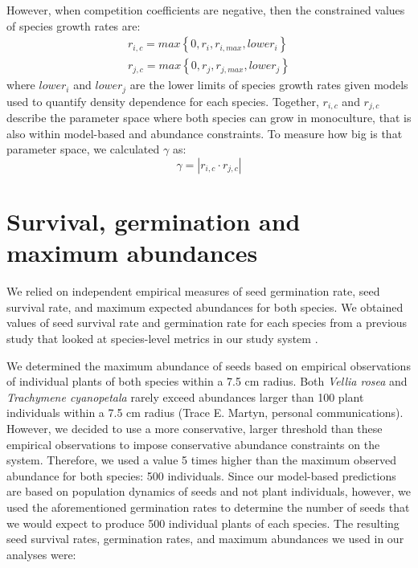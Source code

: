 \begin{refsection}
However, when competition coefficients are negative, then the constrained values of species growth rates are:
\begin{eqnarray}
  r_{i,c} = max\left \{0, r_{i},  r_{i,max}, lower_{i} \right \}\\
  r_{j,c} = max\left \{0, r_{j},  r_{j,max}, lower_{j} \right \}
\end{eqnarray}
where $lower_{i}$ and $lower_{j}$ are the lower limits of species growth rates given models used to quantify density dependence for each species. Together, $r_{i,c}$ and $r_{j,c}$ describe the parameter space where both species can grow in monoculture, that is also within model-based and abundance constraints. To measure how big is that parameter space, we calculated $\gamma$ as:
\begin{equation}
  \gamma = |r_{i,c} \cdot  r_{j,c}|
\end{equation}

\section*{Survival, germination and maximum abundances}

We relied on independent empirical measures of seed germination rate, seed survival rate, and maximum expected abundances for both species. We obtained values of seed survival rate and germination rate for each species from a previous study that looked at species-level metrics in our study system \citep{towers2021variable}.

We determined the maximum abundance of seeds based on empirical observations of individual plants of both species within a 7.5 cm radius. Both \textit{Vellia rosea} and \textit{Trachymene cyanopetala} rarely exceed abundances larger than 100 plant individuals within a 7.5 cm radius (Trace E. Martyn, personal communications). However, we decided to use a more conservative, larger threshold than these empirical observations to impose conservative abundance constraints on the system. Therefore, we used a value 5 times higher than the maximum observed abundance for both species: 500 individuals. Since our model-based predictions are based on population dynamics of seeds and not plant individuals, however, we used the aforementioned germination rates to determine the number of seeds that we would expect to produce 500 individual plants of each species.  The resulting seed survival rates, germination rates, and maximum abundances we used in our analyses were:


\end{refsection}
